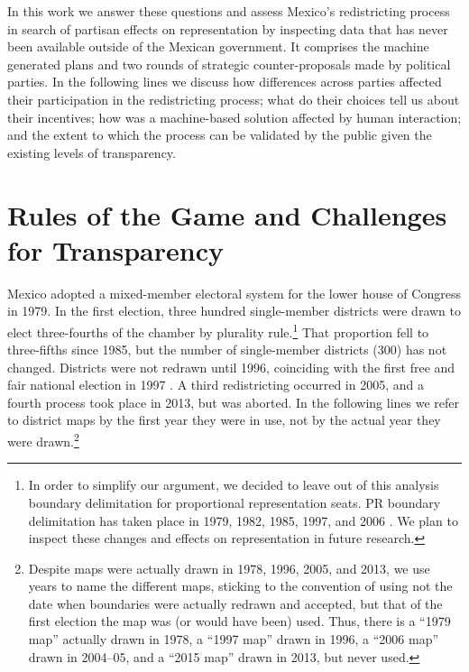 \documentclass[letter,12pt]{article}
\begin{document}
In this work we answer these questions and assess Mexico's redistricting process in search of partisan effects on representation by inspecting data that has never been available outside of the Mexican government. It comprises the machine generated plans and two rounds of strategic counter-proposals made by political parties. In the following lines we discuss how differences across parties affected their participation in the redistricting process;  what do their choices tell us about their incentives; how was a machine-based solution affected by human interaction; and the extent to which the process can be validated by the public given the existing levels of transparency. 

\section{Rules of the Game and Challenges for Transparency}

Mexico adopted a mixed-member electoral system for the lower house of Congress in 1979. In the first election, three hundred single-member districts were drawn to elect three-fourths of the chamber by plurality rule.\footnote{In order to simplify our argument, we decided to leave out of this analysis boundary delimitation for proportional representation seats. PR boundary delimitation has taken place in 1979, 1982, 1985, 1997, and 2006 \citep{palacios.tiradoCircPluris2009}. We plan to inspect these changes and effects on representation in future research.} That proportion fell to three-fifths since 1985, but the number of single-member districts (300) has not changed. Districts were not redrawn until 1996, coinciding with the first free and fair national election in 1997 \citep{lujambio.vives.2008,trelles.mtz.tesisItam.2007}. A third redistricting occurred in 2005, and a fourth process took place in 2013, but was aborted. In the following lines we refer to district maps by the first year they were in use, not by the actual year they were drawn.\footnote{Despite maps were actually drawn in 1978, 1996, 2005, and 2013, we use years to name the different maps, sticking to the convention of using not the date when boundaries were actually redrawn and accepted, but that of the first election the map was (or would have been) used. Thus, there is a ``1979 map'' actually drawn in 1978, a ``1997 map'' drawn in 1996, a ``2006 map'' drawn in 2004--05, and a ``2015 map'' drawn in 2013, but never used.}
\end{document}
